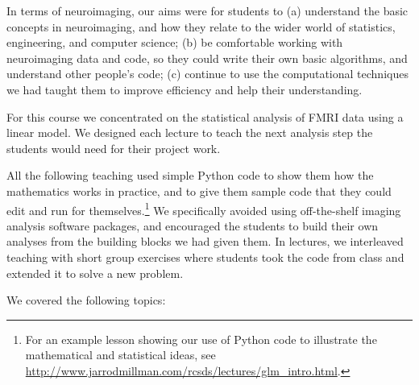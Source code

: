 In terms of neuroimaging, our aims were for students to
(a) understand the basic concepts in neuroimaging,
and how they relate to the wider world of statistics, engineering, and computer science;
(b) be comfortable working with neuroimaging data and code, so they could write
their own basic algorithms, and understand other people's code;
(c) continue to use the computational techniques we had taught them to improve
efficiency and help their understanding.

For this course we concentrated on the statistical analysis of FMRI data using
a linear model.  We designed each lecture to teach the next analysis step the
students would need for their project work.

All the following teaching used simple Python code to show them how the
mathematics works in practice, and to give them sample code that they could
edit and run for themselves.\footnote{For an example lesson showing our use
of Python code to illustrate the mathematical and statistical ideas,
see \url{http://www.jarrodmillman.com/rcsds/lectures/glm_intro.html}.}
We specifically avoided using off-the-shelf imaging analysis software packages,
and encouraged the students to build their own analyses from the building
blocks we had given them.  In lectures, we interleaved teaching with short
group exercises where students took the code from class and extended it to
solve a new problem.

We covered the following topics:

